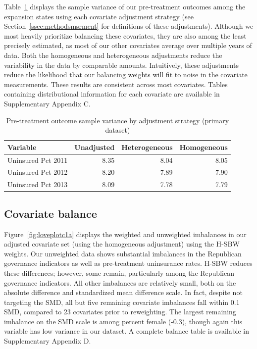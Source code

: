 \documentclass[aoas]{imsart}
\theoremstyle{plain}
\theoremstyle{remark}
\begin{document}
Table~\ref{tab:adjust1} displays the sample variance of our pre-treatment outcomes among the expansion states using each covariate adjustment strategy (see Section~\ref{ssec:methodsmsrment} for definitions of these adjustments). Although we most heavily prioritize balancing these covariates, they are also among the least precisely estimated, as most of our other covariates average over multiple years of data. Both the homogeneous and heterogeneous adjustments reduce the variability in the data by comparable amounts. Intuitively, these adjustments reduce the likelihood that our balancing weights will fit to noise in the covariate measurements. These results are consistent across most covariates. Tables containing distributional information for each covariate are available in Supplementary Appendix C. 

\begin{table}[ht]
\caption{Pre-treatment outcome sample variance by adjustment strategy (primary dataset)}\label{tab:adjust1}
\begin{tabular}{lrrr}
  \hline
Variable & Unadjusted & Heterogeneous & Homogeneous \\ 
  \hline
Uninsured Pct 2011 & 8.35 & 8.04 & 8.05 \\ 
  Uninsured Pct 2012 & 8.20 & 7.89 & 7.90 \\ 
  Uninsured Pct 2013 & 8.09 & 7.78 & 7.79 \\ 
   \hline
\end{tabular}
\end{table}

\subsection{Covariate balance}

Figure~\ref{fig:loveplotc1a} displays the weighted and unweighted imbalances in our adjusted covariate set (using the homogeneous adjustment) using the H-SBW weights. Our unweighted data shows substantial imbalances in the Republican governance indicators as well as pre-treatment uninsurance rates. H-SBW reduces these differences; however, some remain, particularly among the Republican governance indicators. All other imbalances are relatively small, both on the absolute difference and standardized mean difference scale. In fact, despite not targeting the SMD, all but five remaining covariate imbalances fall within 0.1 SMD, compared to 23 covariates prior to reweighting. The largest remaining imbalance on the SMD scale is among percent female (-0.3), though again this variable has low variance in our dataset. A complete balance table is available in Supplementary Appendix D. 
\end{document}
